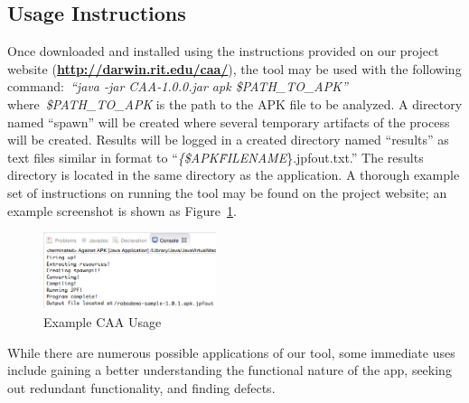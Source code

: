 \documentclass{sig-alternate}
\begin{document}
\subsection{Usage Instructions}

Once downloaded and installed using the instructions provided on our project website (\textbf{\url{http://darwin.rit.edu/caa/}}), the tool may be used with the following command:~\emph{``java -jar CAA-1.0.0.jar \-apk \$PATH\_TO\_APK''} where~\emph{\$PATH\_TO\_APK} is the path to the APK file to be analyzed. A directory named ``spawn'' will be created where several temporary artifacts of the process will be created. Results will be logged in a created directory named ``results'' as text files similar in format to ``\emph{\{\$APK\~FILENAME}\}.jpfout.txt.'' The results directory is located in the same directory as the application. A thorough example set of instructions on running the tool may be found on the project website; an example screenshot is shown as Figure~\ref{fig:usingCAA}.





\begin{figure}[ht!]
\centering
\includegraphics[width=0.45\textwidth]{images/CAA_Eclipse_small.png}
\caption{Example CAA Usage}
\label{fig:usingCAA}
\end{figure}

While there are numerous possible applications of our tool, some immediate uses include gaining a better understanding the functional nature of the app, seeking out redundant functionality, and finding defects.


\end{document}
